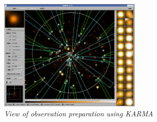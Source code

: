 \documentclass{literature}
\begin{document}
\begin{figure}[!htp]
\centering
\includegraphics[width=0.6\textwidth]{kmos_karma.png}
\caption{\footnotesize{\emph{View of observation preparation using KARMA}}}
\label{fig:kmos_karma}
\end{figure} 
\end{document}
